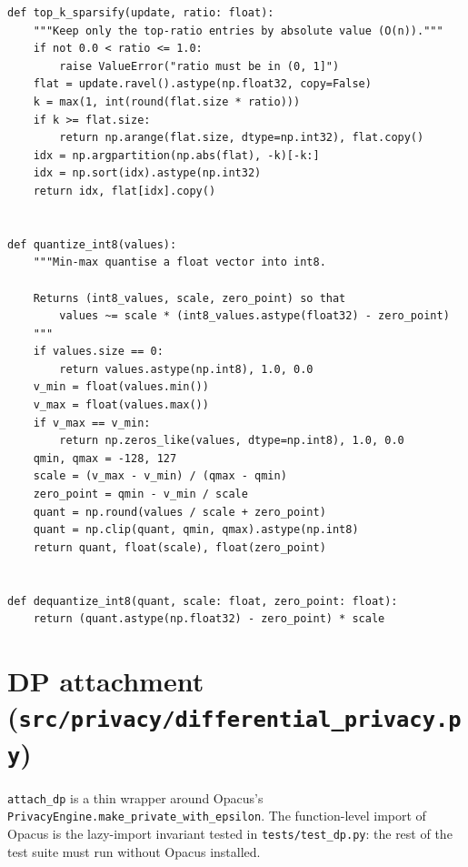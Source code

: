 \documentclass[11pt,a4paper]{report}
\begin{document}
\begin{verbatim}
def top_k_sparsify(update, ratio: float):
    """Keep only the top-ratio entries by absolute value (O(n))."""
    if not 0.0 < ratio <= 1.0:
        raise ValueError("ratio must be in (0, 1]")
    flat = update.ravel().astype(np.float32, copy=False)
    k = max(1, int(round(flat.size * ratio)))
    if k >= flat.size:
        return np.arange(flat.size, dtype=np.int32), flat.copy()
    idx = np.argpartition(np.abs(flat), -k)[-k:]
    idx = np.sort(idx).astype(np.int32)
    return idx, flat[idx].copy()


def quantize_int8(values):
    """Min-max quantise a float vector into int8.

    Returns (int8_values, scale, zero_point) so that
        values ~= scale * (int8_values.astype(float32) - zero_point)
    """
    if values.size == 0:
        return values.astype(np.int8), 1.0, 0.0
    v_min = float(values.min())
    v_max = float(values.max())
    if v_max == v_min:
        return np.zeros_like(values, dtype=np.int8), 1.0, 0.0
    qmin, qmax = -128, 127
    scale = (v_max - v_min) / (qmax - qmin)
    zero_point = qmin - v_min / scale
    quant = np.round(values / scale + zero_point)
    quant = np.clip(quant, qmin, qmax).astype(np.int8)
    return quant, float(scale), float(zero_point)


def dequantize_int8(quant, scale: float, zero_point: float):
    return (quant.astype(np.float32) - zero_point) * scale
\end{verbatim}

\section{DP attachment (\texttt{src/privacy/differential\_privacy.py})}\label{lst:dp}

\texttt{attach\_dp} is a thin wrapper around Opacus's
\texttt{PrivacyEngine.make\_private\_with\_epsilon}. The function-level
import of Opacus is the lazy-import invariant tested in
\texttt{tests/test\_dp.py}: the rest of the test suite must run without
Opacus installed.
\end{document}
